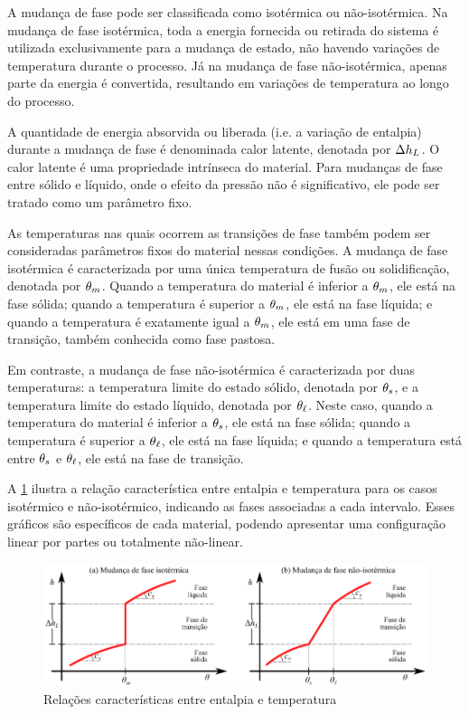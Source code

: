 \documentclass[Tese.tex]{subfiles}
\begin{document}
A mudança de fase pode ser classificada como isotérmica ou não-isotérmica. Na mudança de fase isotérmica, toda a energia fornecida ou retirada do sistema é utilizada exclusivamente para a mudança de estado, não havendo variações de temperatura durante o processo. Já na mudança de fase não-isotérmica, apenas parte da energia é convertida, resultando em variações de temperatura ao longo do processo.

A quantidade de energia absorvida ou liberada (i.e. a variação de entalpia) durante a mudança de fase é denominada calor latente, denotada por $\Delta h_L$. O calor latente é uma propriedade intrínseca do material. Para mudanças de fase entre sólido e líquido, onde o efeito da pressão não é significativo, ele pode ser tratado como um parâmetro fixo.

As temperaturas nas quais ocorrem as transições de fase também podem ser consideradas parâmetros fixos do material nessas condições. A mudança de fase isotérmica é caracterizada por uma única temperatura de fusão ou solidificação, denotada por $\theta_m$. Quando a temperatura do material é inferior a $\theta_m$, ele está na fase sólida; quando a temperatura é superior a $\theta_m$, ele está na fase líquida; e quando a temperatura é exatamente igual a $\theta_m$, ele está em uma fase de transição, também conhecida como fase pastosa.

Em contraste, a mudança de fase não-isotérmica é caracterizada por duas temperaturas: a temperatura limite do estado sólido, denotada por $\theta_s$, e a temperatura limite do estado líquido, denotada por $\theta_\ell$. Neste caso, quando a temperatura do material é inferior a $\theta_s$, ele está na fase sólida; quando a temperatura é superior a $\theta_\ell$, ele está na fase líquida; e quando a temperatura está entre $\theta_s$ e $\theta_\ell$, ele está na fase de transição.

A \cref{fig:enthalpy} ilustra a relação característica entre entalpia e temperatura para os casos isotérmico e não-isotérmico, indicando as fases associadas a cada intervalo. Esses gráficos são específicos de cada material, podendo apresentar uma configuração linear por partes ou totalmente não-linear.


\begin{figure}[!htb]
	\centering
	\caption{Relações características entre entalpia e temperatura}
	\label{fig:enthalpy}
	\includegraphics[scale=1.05]{Figuras/enthalpy.pdf}
\end{figure}
\end{document}
